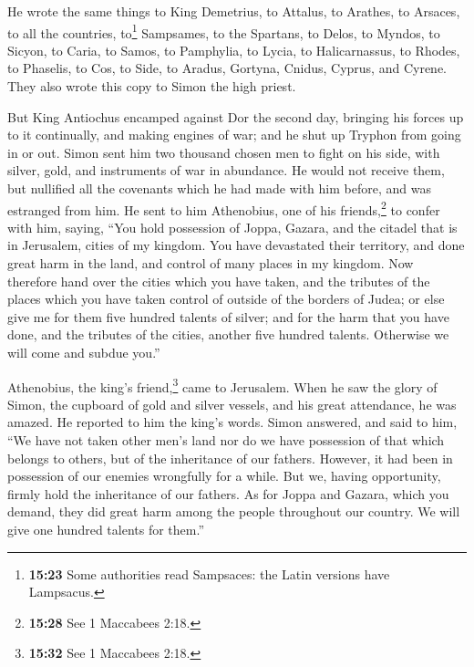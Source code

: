 He wrote the same things to King Demetrius, to Attalus,
to Arathes, to Arsaces,  to all the countries,
to\footnote{\textbf{15:23} Some authorities read Sampsaces: the Latin
  versions have Lampsacus.} Sampsames, to the Spartans, to Delos, to
Myndos, to Sicyon, to Caria, to Samos, to Pamphylia, to Lycia, to
Halicarnassus, to Rhodes, to Phaselis, to Cos, to Side, to Aradus,
Gortyna, Cnidus, Cyprus, and Cyrene.  They also wrote
this copy to Simon the high priest.

 But King Antiochus encamped against Dor the second day,
bringing his forces up to it continually, and making engines of war; and
he shut up Tryphon from going in or out.  Simon sent him
two thousand chosen men to fight on his side, with silver, gold, and
instruments of war in abundance.  He would not receive
them, but nullified all the covenants which he had made with him before,
and was estranged from him.  He sent to him Athenobius,
one of his friends,\footnote{\textbf{15:28} See 1 Maccabees 2:18.} to
confer with him, saying, ``You hold possession of Joppa, Gazara, and the
citadel that is in Jerusalem, cities of my kingdom.  You
have devastated their territory, and done great harm in the land, and
control of many places in my kingdom.  Now therefore hand
over the cities which you have taken, and the tributes of the places
which you have taken control of outside of the borders of Judea;
 or else give me for them five hundred talents of silver;
and for the harm that you have done, and the tributes of the cities,
another five hundred talents. Otherwise we will come and subdue you.''

 Athenobius, the king's friend,\footnote{\textbf{15:32}
  See 1 Maccabees 2:18.} came to Jerusalem. When he saw the glory of
Simon, the cupboard of gold and silver vessels, and his great
attendance, he was amazed. He reported to him the king's words.
 Simon answered, and said to him, ``We have not taken
other men's land nor do we have possession of that which belongs to
others, but of the inheritance of our fathers. However, it had been in
possession of our enemies wrongfully for a while.  But
we, having opportunity, firmly hold the inheritance of our fathers.
 As for Joppa and Gazara, which you demand, they did
great harm among the people throughout our country. We will give one
hundred talents for them.''


